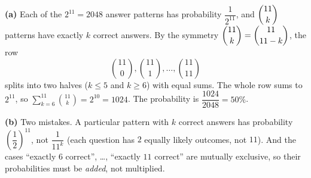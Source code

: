 \textbf{(a)} Each of the $2^{11}=2048$ answer patterns has probability $\dfrac{1}{2^{11}}$, and $\dbinom{11}{k}$ patterns have exactly $k$ correct answers. By the symmetry $\dbinom{11}{k}=\dbinom{11}{11-k}$, the row
\[\binom{11}{0},\binom{11}{1},\ldots,\binom{11}{11}\]
splits into two halves ($k\le5$ and $k\ge6$) with equal sums. The whole row sums to $2^{11}$, so $\displaystyle\sum_{k=6}^{11}\binom{11}{k}=2^{10}=1024$. The probability is $\dfrac{1024}{2048}=\boxed{50\%}$.

\textbf{(b)} Two mistakes. A particular pattern with $k$ correct answers has probability $\left(\dfrac12\right)^{11}$, not $\dfrac{1}{11^k}$ (each question has $2$ equally likely outcomes, not $11$). And the cases ``exactly $6$ correct'', \ldots, ``exactly $11$ correct'' are mutually exclusive, so their probabilities must be \emph{added}, not multiplied.
